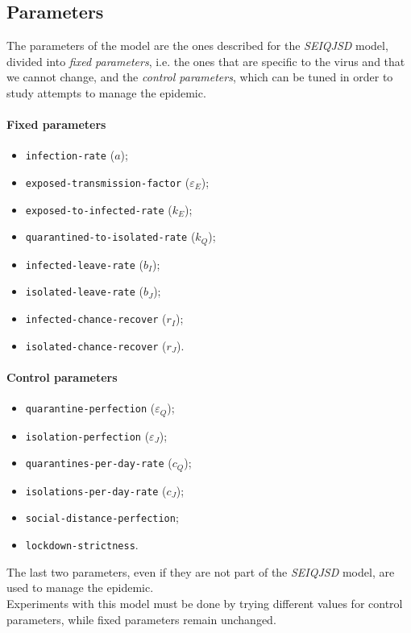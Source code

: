 \documentclass[12pt]{llncs}
\begin{document}
\subsection{Parameters}
The parameters of the model are the ones described for the \textit{SEIQJSD} model, divided into \textit{fixed parameters}, i.e. the ones that are specific to the virus and that we cannot change, and the \textit{control parameters}, which can be tuned in order to study attempts to manage the epidemic.

\paragraph{Fixed parameters}
\begin{itemize}
\item \texttt{infection-rate} ($a$);
\item \texttt{exposed-transmission-factor} ($\varepsilon_E$);
\item \texttt{exposed-to-infected-rate} ($k_E$);
\item \texttt{quarantined-to-isolated-rate} ($k_Q$);
\item \texttt{infected-leave-rate} ($b_I$);
\item \texttt{isolated-leave-rate} ($b_J$);
\item \texttt{infected-chance-recover} ($r_I$);
\item \texttt{isolated-chance-recover} ($r_J$).
\end{itemize}

\paragraph{Control parameters}
\begin{itemize}
\item \texttt{quarantine-perfection} ($\varepsilon_Q$);
\item \texttt{isolation-perfection} ($\varepsilon_J$);
\item \texttt{quarantines-per-day-rate} ($c_Q$);
\item \texttt{isolations-per-day-rate} ($c_J$);
\item \texttt{social-distance-perfection};
\item \texttt{lockdown-strictness}.
\end{itemize}
The last two parameters, even if they are not part of the \textit{SEIQJSD} model, are used to manage the epidemic.\\
Experiments with this model must be done by trying different values for control parameters, while fixed parameters remain unchanged.
\end{document}
